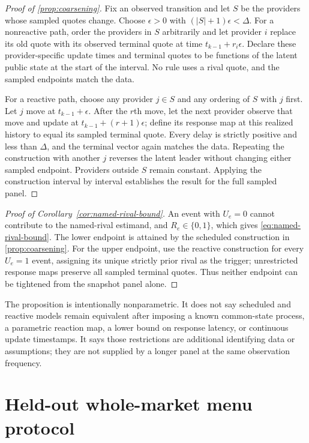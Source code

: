 \documentclass[11pt]{article}
\newcommand{\1}{\mathbf{1}}
\begin{document}
\begin{proof}[Proof of \cref{prop:coarsening}]
Fix an observed transition and let $S$ be the providers whose sampled quotes
change.  Choose $\epsilon>0$ with $(|S|+1)\epsilon<\Delta$.  For a nonreactive
path, order the providers in $S$ arbitrarily and let provider $i$ replace its old
quote with its observed terminal quote at time $t_{k-1}+r_i\epsilon$.  Declare
these provider-specific update times and terminal quotes to be functions of the
latent public state at the start of the interval.  No rule uses a rival quote, and
the sampled endpoints match the data.

For a reactive path, choose any provider $j\in S$ and any ordering of $S$ with
$j$ first.  Let $j$ move at $t_{k-1}+\epsilon$.  After the $r$th move, let the
next provider observe that move and update at $t_{k-1}+(r+1)\epsilon$; define its
response map at this realized history to equal its sampled terminal quote.
Every delay is strictly positive and less than $\Delta$, and the terminal vector
again matches the data.  Repeating the construction with another $j$ reverses
the latent leader without changing either sampled endpoint.  Providers outside
$S$ remain constant.  Applying the construction interval by interval establishes
the result for the full sampled panel.
\end{proof}

\begin{proof}[Proof of Corollary~\ref{cor:named-rival-bound}]
An event with $U_e=0$ cannot contribute to the named-rival estimand, and
$R_e\in\{0,1\}$, which gives \cref{eq:named-rival-bound}.  The lower endpoint is
attained by the scheduled construction in \cref{prop:coarsening}.  For the upper
endpoint, use the reactive construction for every $U_e=1$ event, assigning its
unique strictly prior rival as the trigger; unrestricted response maps preserve
all sampled terminal quotes.  Thus neither endpoint can be tightened from the
snapshot panel alone.
\end{proof}

The proposition is intentionally nonparametric.  It does not say scheduled and
reactive models remain equivalent after imposing a known common-state process,
a parametric reaction map, a lower bound on response latency, or continuous
update timestamps.  It says those restrictions are additional identifying data
or assumptions; they are not supplied by a longer panel at the same observation
frequency.

\section{Held-out whole-market menu protocol}
\label{app:heldout-matched-market}
\end{document}
